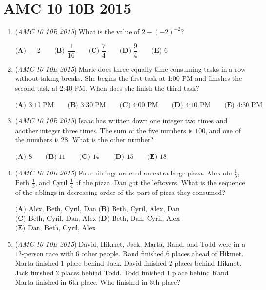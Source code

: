 \section{AMC 10 10B 2015}
        \begin{enumerate}
        	\item (\textit{AMC 10 10B 2015}) What is the value of $2-(-2)^{-2}$?


 $\textbf{(A) } -2 \qquad\textbf{(B) } \dfrac{1}{16} \qquad\textbf{(C) } \dfrac{7}{4} \qquad\textbf{(D) } \dfrac{9}{4} \qquad\textbf{(E) } 6$


	\item (\textit{AMC 10 10B 2015}) Marie does three equally time-consuming tasks in a row without taking breaks. She begins the first task at 1:00 PM and finishes the second task at 2:40 PM. When does she finish the third task?


 $\textbf{(A) }\text{3:10 PM}\qquad\textbf{(B) }\text{3:30 PM}\qquad\textbf{(C) }\text{4:00 PM}\qquad\textbf{(D) }\text{4:10 PM}\qquad\textbf{(E) }\text{4:30 PM}$


	\item (\textit{AMC 10 10B 2015}) Isaac has written down one integer two times and another integer three times. The sum of the five numbers is $100$, and one of the numbers is $28.$ What is the other number?


 $\textbf{(A) } 8 \qquad\textbf{(B) } 11 \qquad\textbf{(C) } 14 \qquad\textbf{(D) } 15 \qquad\textbf{(E) } 18$


	\item (\textit{AMC 10 10B 2015}) Four siblings ordered an extra large pizza. Alex ate $\frac15$, Beth $\frac13$, and Cyril $\frac14$ of the pizza. Dan got the leftovers. What is the sequence of the siblings in decreasing order of the part of pizza they consumed?


 $\textbf{(A) } \text{Alex, Beth, Cyril, Dan}$
$\textbf{(B) } \text{Beth, Cyril, Alex, Dan}$
$\textbf{(C) } \text{Beth, Cyril, Dan, Alex}$
$\textbf{(D) } \text{Beth, Dan, Cyril, Alex}$
$\textbf{(E) } \text{Dan, Beth, Cyril, Alex}$


	\item (\textit{AMC 10 10B 2015}) David, Hikmet, Jack, Marta, Rand, and Todd were in a $12$-person race with $6$ other people. Rand finished $6$ places ahead of Hikmet. Marta finished $1$ place behind Jack. David finished $2$ places behind Hikmet. Jack finished $2$ places behind Todd. Todd finished $1$ place behind Rand. Marta finished in $6$th place. Who finished in $8$th place?



\end{enumerate}
